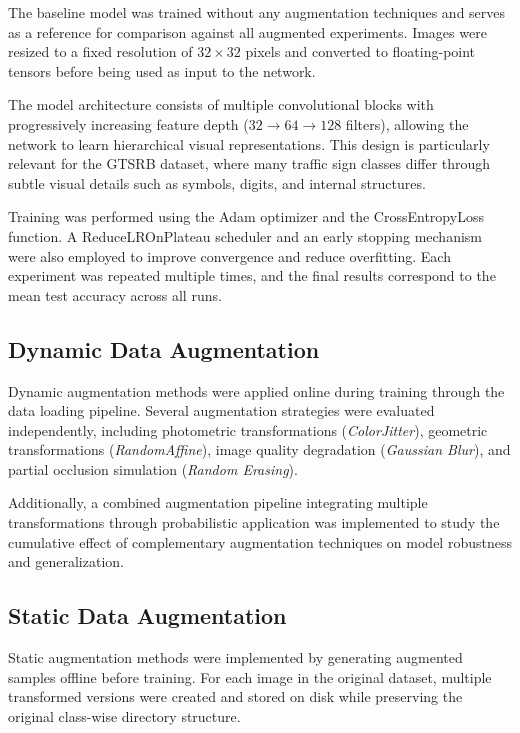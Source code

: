 \documentclass[conference]{IEEEtran}
\begin{document}
The baseline model was trained without any augmentation techniques and serves as a reference for comparison against all augmented experiments. Images were resized to a fixed resolution of $32 \times 32$ pixels and converted to floating-point tensors before being used as input to the network.

The model architecture consists of multiple convolutional blocks with progressively increasing feature depth ($32 \rightarrow 64 \rightarrow 128$ filters), allowing the network to learn hierarchical visual representations. This design is particularly relevant for the GTSRB dataset, where many traffic sign classes differ through subtle visual details such as symbols, digits, and internal structures.

Training was performed using the Adam optimizer and the CrossEntropyLoss function. A ReduceLROnPlateau scheduler and an early stopping mechanism were also employed to improve convergence and reduce overfitting. Each experiment was repeated multiple times, and the final results correspond to the mean test accuracy across all runs.

\subsection{Dynamic Data Augmentation}

Dynamic augmentation methods were applied online during training through the data loading pipeline. Several augmentation strategies were evaluated independently, including photometric transformations (\textit{ColorJitter}), geometric transformations (\textit{RandomAffine}), image quality degradation (\textit{Gaussian Blur}), and partial occlusion simulation (\textit{Random Erasing}).

Additionally, a combined augmentation pipeline integrating multiple transformations through probabilistic application was implemented to study the cumulative effect of complementary augmentation techniques on model robustness and generalization.

\subsection{Static Data Augmentation}

Static augmentation methods were implemented by generating augmented samples offline before training. For each image in the original dataset, multiple transformed versions were created and stored on disk while preserving the original class-wise directory structure.
\end{document}
